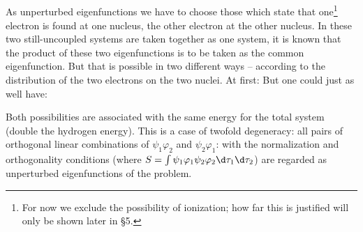 \begin{paper}{1}
\subsection{} As unperturbed eigenfunctions we have to choose those which state that one\footnote{For now we exclude the possibility of ionization; how far this is justified will only be shown later in \S5.} electron is found at one nucleus, the other electron at the other nucleus. In these two still-uncoupled systems are taken together as one system, it is known that the product of these two eigenfunctions is to be taken as the common eigenfunction. But that is possible in two different ways -- according to the distribution of the two electrons on the two nuclei. At first:
But one could just as well have:

Both possibilities are associated with the same energy for the total system (double the hydrogen energy). This is a case of twofold degeneracy: all pairs of orthogonal linear combinations of $\psi_1\varphi_2$ and $\psi_2\varphi_1$:
with the normalization and orthogonality conditions
(where $S=\int\psi_1\varphi_1\psi_2\varphi_2\d\tau_1\d\tau_2$) are regarded as unperturbed eigenfunctions of the problem.


\end{paper}
